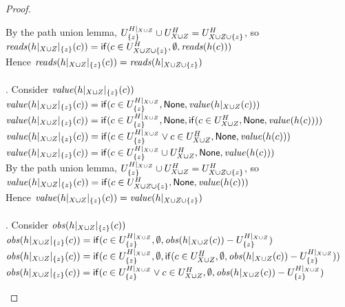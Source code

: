 \begin{proof}
\begin{tabbedproof}
\ooooo By the path union lemma, $U^{H|_{X \cup Z}}_{\{{z}\}} \cup U^H_{X \cup Z} = U^H_{X \cup Z \cup \{{z}\}}$, so \\
\ooooox $\mathit{reads}(h|_{X \cup Z}|_{\{{z}\}}(c)) = \mathsf{if}({c \in U^H_{X \cup Z \cup \{{z}\}}}, {\emptyset}, {\mathit{reads}(h(c))})$ \\
\ooooo Hence $\mathit{reads}(h|_{X \cup Z}|_{\{{z}\}}(c)) = \mathit{reads}(h|_{X \cup Z \cup \{{z}\}})$ \\ \\
. Consider $\mathit{value}(h|_{X \cup Z}|_{\{{z}\}}(c))$ \\
\ooooo $\mathit{value}(h|_{X \cup Z}|_{\{{z}\}}(c)) = \mathsf{if}({c \in U^{H|_{X \cup Z}}_{\{{z}\}}}, {\mathsf{None}}, {\mathit{value}(h|_{X \cup Z}(c))})$ \\
\ooooo $\mathit{value}(h|_{X \cup Z}|_{\{{z}\}}(c)) = \mathsf{if}({c \in U^{H|_{X \cup Z}}_{\{{z}\}}}, {\mathsf{None}}, {\mathsf{if}({c \in U^H_{X \cup Z}}, {\mathsf{None}}, {\mathit{value}(h(c))})})$ \\
\ooooo $\mathit{value}(h|_{X \cup Z}|_{\{{z}\}}(c)) = \mathsf{if}({c \in U^{H|_{X \cup Z}}_{\{{z}\}} \vee c \in U^H_{X \cup Z}}, {\mathsf{None}}, {\mathit{value}(h(c))})$ \\
\ooooo $\mathit{value}(h|_{X \cup Z}|_{\{{z}\}}(c)) = \mathsf{if}({c \in U^{H|_{X \cup Z}}_{\{{z}\}} \cup U^H_{X \cup Z}}, {\mathsf{None}}, {\mathit{value}(h(c))})$ \\
\ooooo By the path union lemma, $U^{H|_{X \cup Z}}_{\{{z}\}} \cup U^H_{X \cup Z} = U^H_{X \cup Z \cup \{{z}\}}$, so \\
\ooooox $\mathit{value}(h|_{X \cup Z}|_{\{{z}\}}(c)) = \mathsf{if}({c \in U^H_{X \cup Z \cup \{{z}\}}}, {\mathsf{None}}, {\mathit{value}(h(c))})$ \\
\ooooo Hence $\mathit{value}(h|_{X \cup Z}|_{\{{z}\}}(c)) = \mathit{value}(h|_{X \cup Z \cup \{{z}\}})$ \\ \\
. Consider $\mathit{obs}(h|_{X \cup Z}|_{\{{z}\}}(c))$ \\
\ooooo $\mathit{obs}(h|_{X \cup Z}|_{\{{z}\}}(c)) = \mathsf{if}({c \in U^{H|_{X \cup Z}}_{\{{z}\}}}, {\emptyset}, {\mathit{obs}(h|_{X \cup Z}(c)) - U^{H|_{X \cup Z}}_{\{{z}\}}})$ \\
\ooooo $\mathit{obs}(h|_{X \cup Z}|_{\{{z}\}}(c)) = \mathsf{if}({c \in U^{H|_{X \cup Z}}_{\{{z}\}}}, {\emptyset}, {\mathsf{if}({c \in U^H_{X \cup Z}}, {\emptyset}, {\mathit{obs}(h|_{X \cup Z}(c)) - U^{H|_{X \cup Z}}_{\{{z}\}}})})$ \\
\ooooo $\mathit{obs}(h|_{X \cup Z}|_{\{{z}\}}(c)) = \mathsf{if}({c \in U^{H|_{X \cup Z}}_{\{{z}\}} \vee c \in U^H_{X \cup Z}}, {\emptyset}, {\mathit{obs}(h|_{X \cup Z}(c)) - U^{H|_{X \cup Z}}_{\{{z}\}}})$ \\

\end{tabbedproof}
\end{proof}
